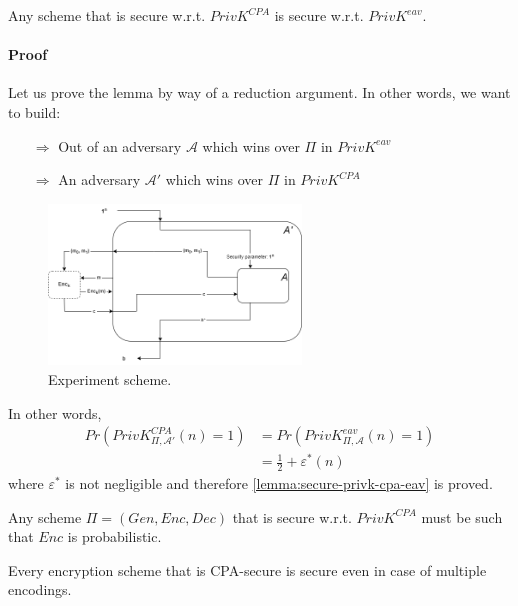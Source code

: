 \documentclass[../main]{subfiles}
\begin{document}
\begin{lemma}
	\label{lemma:secure-privk-cpa-eav}
	Any scheme that is secure w.r.t. $PrivK^{CPA}$ is secure w.r.t. $PrivK^{eav}.$
\end{lemma}

\paragraph{Proof}
Let us prove the lemma by way of a reduction argument. In other words, we want to build:
\begin{itemize}
	\item[$\Rightarrow{}$] Out of an adversary $\mathcal{A}$ which wins over $\Pi{}$ in $PrivK^{eav}$
	\item[$\Rightarrow{}$] An adversary $\mathcal{A}'$ which wins over $\Pi{}$ in $PrivK^{CPA}$
\end{itemize}
\begin{figure}[H]
    \centering
    \includegraphics[width=0.6\textwidth]{images/PrivK_CPA_secure_PrivK_eav_secure}
    \caption{Experiment scheme.}
\end{figure}
In other words,
\begin{align*}
    Pr(PrivK^{CPA}_{\Pi{}, \mathcal{A}'}(n)=1) &= Pr(PrivK^{eav}_{\Pi{}, \mathcal{A}}(n)=1) \\
    &= \frac{1}{2} + \varepsilon^*(n)
\end{align*}
where $\varepsilon^*$ is not negligible and therefore \ref{lemma:secure-privk-cpa-eav} is proved.

\begin{lemma}
    Any scheme $\Pi{}=(Gen, Enc, Dec)$ that is secure w.r.t. $PrivK^{CPA}$ must be such that $Enc$ is probabilistic.
\end{lemma}

\begin{theorem}
    Every encryption scheme that is CPA-secure is secure even in case of multiple encodings.
\end{theorem}
\end{document}
